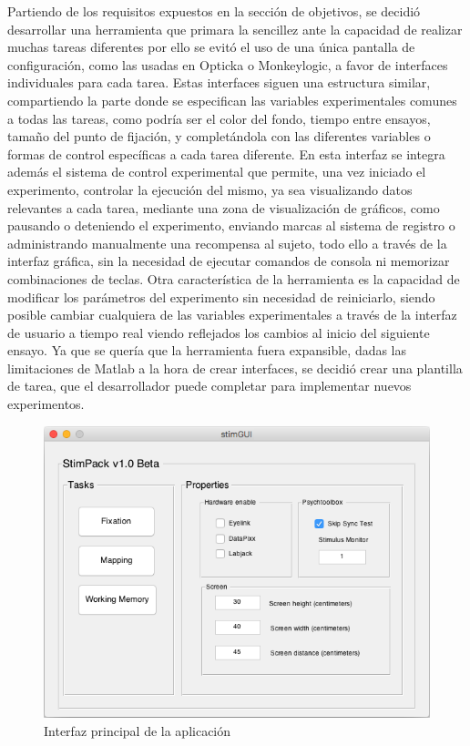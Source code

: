 \documentclass[conference]{IEEEtran}
\begin{document}
Partiendo de los requisitos expuestos en la sección de objetivos, se decidió desarrollar una herramienta que primara la sencillez ante la capacidad de realizar muchas tareas diferentes por ello se evitó el uso de una única pantalla de configuración, como las usadas en Opticka o Monkeylogic, a favor de interfaces individuales para cada tarea. 
Estas interfaces siguen una estructura similar, compartiendo la parte donde se especifican las variables experimentales comunes a todas las tareas, como podría ser el color del fondo, tiempo entre ensayos, tamaño del punto de fijación, y completándola con las diferentes variables o formas de control específicas a cada tarea diferente. En esta interfaz se integra además el sistema de control experimental que permite, una vez iniciado el experimento, controlar la ejecución del mismo, ya sea visualizando datos relevantes a cada tarea, mediante una zona de visualización de gráficos, como pausando o deteniendo el experimento, enviando marcas al sistema de registro o administrando manualmente una recompensa al sujeto, todo ello a través de la interfaz gráfica, sin la necesidad de ejecutar comandos de consola ni memorizar combinaciones de teclas. 
Otra característica de la herramienta es la capacidad de modificar los parámetros del experimento sin necesidad de reiniciarlo, siendo posible cambiar cualquiera de las variables experimentales a través de la interfaz de usuario a tiempo real viendo reflejados los cambios al inicio del siguiente ensayo.
Ya que se quería que la herramienta fuera expansible, dadas las limitaciones de Matlab a la hora de crear interfaces, se decidió crear una plantilla de tarea, que el desarrollador puede completar para implementar nuevos experimentos.

\begin{figure}[htbp]
\centerline{\includegraphics[width=\linewidth]{figures/main_gui}}
\caption{Interfaz principal de la aplicación}
\label{figmainGUI}
\end{figure}
\end{document}

